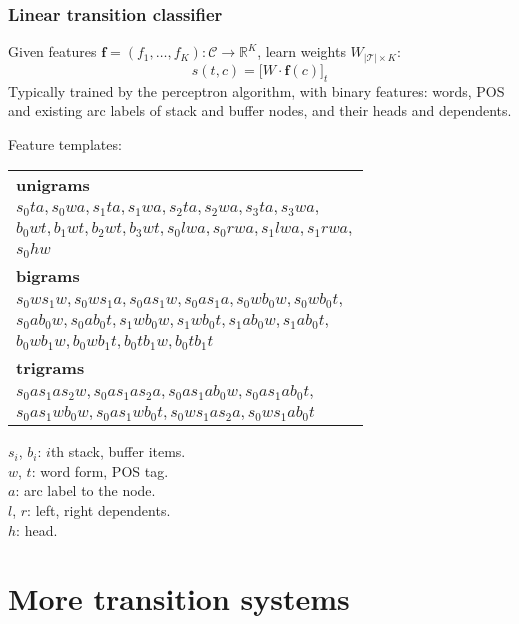 \documentclass[t]{beamer}
\begin{document}
\begin{frame}
    \frametitle{Linear transition classifier}
    Given features $\mathbf{f}=(f_1, \ldots, f_K) : \mathcal{C}\to\mathbb{R}^K$, learn weights $W_{|\mathcal{T}|\times K}$:
    \[
    s(t,c)=\big[W\cdot\mathbf{f}(c)\big]_t
    \]
    Typically trained by the perceptron algorithm, with binary features:
	words, POS and existing arc labels of stack and buffer nodes, and
	their heads and dependents.
    
    \pause\vfill
    
    Feature templates:
    
    \begin{minipage}{.5\textwidth}
	\begin{adjustbox}{margin=3pt,frame,scale=.6}
	\begin{tabular}{l}
	\textbf{unigrams} \\
	$s_0ta, s_0wa, s_1ta, s_1wa, s_2ta, s_2wa, s_3ta, s_3wa,$ \\
	$b_0wt, b_1wt, b_2wt, b_3wt,s_0lwa, s_0rwa, s_1lwa, s_1rwa,$ \\
	$s_0hw$ \\
	\textbf{bigrams} \\
	$s_0ws_1w, s_0ws_1a, s_0as_1w, s_0as_1a, s_0wb_0w, s_0wb_0t,$ \\
	$s_0ab_0w, s_0ab_0t, s_1wb_0w, s_1wb_0t, s_1ab_0w, s_1ab_0t,$ \\
	$b_0wb_1w, b_0wb_1t, b_0tb_1w, b_0tb_1t$ \\
	\textbf{trigrams} \\
	$s_0as_1as_2w, s_0as_1as_2a, s_0as_1ab_0w, s_0as_1ab_0t,$ \\
	$s_0as_1wb_0w, s_0as_1wb_0t, s_0ws_1as_2a, s_0ws_1ab_0t$
	\end{tabular}
	\end{adjustbox}
	\end{minipage}
	\begin{minipage}{.45\textwidth}\scriptsize
	  $s_i$, $b_i$: $i$th stack, buffer items.\\
	  $w$, $t$: word form, POS tag. \\
	  $a$: arc label to the node.\\
	  $l$, $r$: left, right dependents. \\
	  $h$: head.
	\end{minipage}
\end{frame}




\section{More transition systems}
\end{document}
